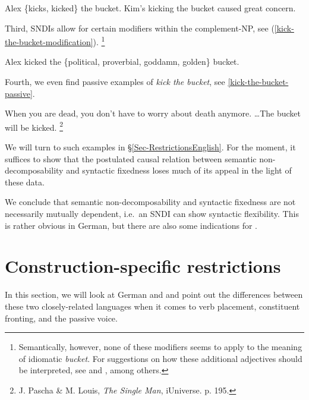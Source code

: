 \documentclass[output=paper]{langsci/langscibook}
\begin{document}
\begin{exe}
\ex\label{kick-the-bucket-inflection}
\begin{xlist}
\ex Alex \{kicks, kicked\} the bucket. \label{kick-the-bucket-inflection-sing}
\ex Kim's kicking the bucket caused great concern. \label{kick-the-bucket-inflection-ing}
\end{xlist}
\end{exe}

Third, SNDIs allow for certain modifiers within the complement-NP, see (\ref{kick-the-bucket-modification}).%
\footnote{Semantically, however, none of these modifiers seems to apply to the meaning of idiomatic \textit{bucket}. For suggestions on how these additional adjectives should be interpreted, see \cite{Ernst:81} and \cite{Potts:05}, among others.}

\begin{exe}
\ex\label{kick-the-bucket-modification}Alex kicked the \{political, proverbial, goddamn, golden\} bucket.
\end{exe}

Fourth, we even find  passive examples of \textit{kick the bucket}, see \ref{kick-the-bucket-passive}.

\begin{exe}
\ex\label{kick-the-bucket-passive}When you are dead, you don't have to worry about death anymore. \ldots The bucket will be kicked.%
\footnote{J. Pascha \& M. Louis, \textit{The Single Man}, iUniverse.  p. 195.}
\end{exe}

We will turn to such examples in §\ref{Sec-RestrictionsEnglish}. For the moment, it suffices to show that the postulated causal relation between  semantic non-decomposability and syntactic fixedness loses much of its appeal in the light of these data.

We conclude that semantic non-decomposability and syntactic fixedness are not necessarily mutually dependent, i.e.\ an SNDI can show syntactic flexibility. This is rather obvious in  German, but there are also some indications for .



\section{Construction-specific restrictions}
\label{Sec-ConstructionSpecificRestrictions}


In this section, we will look at German and  and point out the differences between these two closely-related languages when it comes to verb placement, constituent fronting, and the  passive voice.
\end{document}
